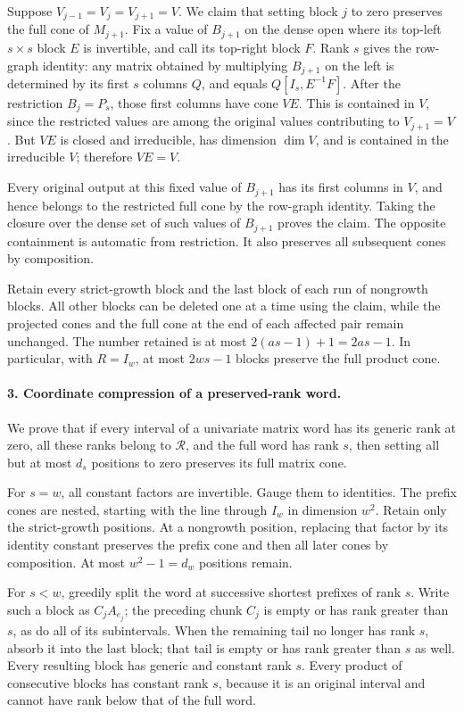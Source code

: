 \documentclass[11pt,a4paper]{article}
\theoremstyle{definition}\newtheorem{definition}{Definition}
\begin{document}
Suppose $V_{j-1}=V_j=V_{j+1}=V$.  We claim that setting
block $j$ to zero preserves the full cone of $M_{j+1}$.
Fix a value of $B_{j+1}$ on the dense open where its top-left
$s\times s$ block $E$ is invertible, and call its top-right
block $F$.  Rank $s$ gives the row-graph identity: any matrix
obtained by multiplying $B_{j+1}$ on the left is determined
by its first $s$ columns $Q$, and equals $Q[I_s,E^{-1}F]$.
After the restriction $B_j=P_s$, those first columns have
cone $VE$.  This is contained in $V$, since the restricted
values are among the original values contributing to
$V_{j+1}=V$.  But $VE$ is closed and irreducible, has
dimension $\dim V$, and is contained in the irreducible $V$;
therefore $VE=V$.

Every original output at this fixed value of $B_{j+1}$ has
its first columns in $V$, and hence belongs to the restricted
full cone by the row-graph identity.  Taking the closure over
the dense set of such values of $B_{j+1}$ proves the claim.
The opposite containment is automatic from restriction.
It also preserves all subsequent cones by composition.

Retain every strict-growth block and the last block of each
run of nongrowth blocks.  All other blocks can be deleted
one at a time using the claim, while the projected cones
and the full cone at the end of each affected pair remain
unchanged.  The number retained is at most
$2(as-1)+1=2as-1$.  In particular, with $R=I_w$, at most
$2ws-1$ blocks preserve the full product cone.

\paragraph{3. Coordinate compression of a preserved-rank word.}
We prove that if every interval of a univariate matrix word
has its generic rank at zero, all these ranks belong to
$\mathcal R$, and the full word has rank $s$, then setting
all but at most $d_s$ positions to zero preserves its full
matrix cone.

For $s=w$, all constant factors are invertible.  Gauge them
to identities.  The prefix cones are nested, starting with
the line through $I_w$ in dimension $w^2$.  Retain only the
strict-growth positions.  At a nongrowth position, replacing
that factor by its identity constant preserves the prefix
cone and then all later cones by composition.  At most
$w^2-1=d_w$ positions remain.

For $s<w$, greedily split the word at successive shortest
prefixes of rank $s$.  Write such a block as $C_jA_{e_j}$;
the preceding chunk $C_j$ is empty or has rank greater
than $s$, as do all of its subintervals.  When the remaining
tail no longer has rank $s$, absorb it into the last block;
that tail is empty or has rank greater than $s$ as well.
Every resulting block has generic and constant rank $s$.
Every product of consecutive blocks has constant rank $s$,
because it is an original interval and cannot have rank
below that of the full word.
\end{document}
